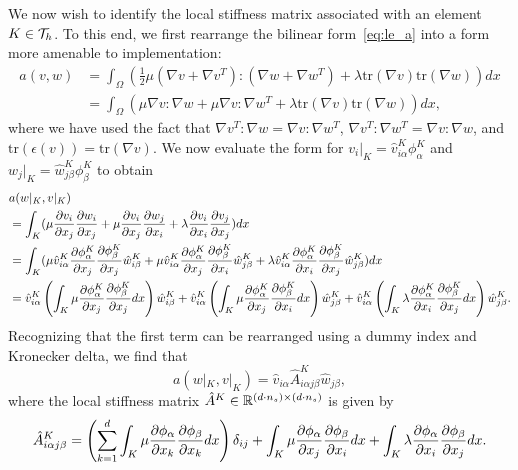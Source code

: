 We now wish to identify the local stiffness matrix associated with an element $K \in \mathcal{T}_h$.  To this end, we first rearrange the bilinear form~\eqref{eq:le_a} into a form more amenable to implementation:
\begin{align*}
  a(v,w)
  &=
  \int_\Omega (\frac{1}{2} \mu (\nabla v + \nabla v^T) : (\nabla w + \nabla w^T) + \lambda \text{tr}(\nabla v) \text{tr}(\nabla w)) dx
  \\
  &=
  \int_\Omega ( \mu \nabla v :\nabla w + \mu \nabla v : \nabla w^T + \lambda \text{tr}(\nabla v) \text{tr}(\nabla w)) dx,
\end{align*}
where we have used the fact that $\nabla v^T : \nabla w = \nabla v : \nabla w^T$, $\nabla v^T: \nabla w^T = \nabla v : \nabla w$, and $\text{tr}(\epsilon(v)) = \text{tr}(\nabla v)$. We now evaluate the form for $v_i|_K = \hat v^K_{i\alpha} \phi^K_\alpha$ and $w_j|_K = \hat w^K_{j\beta} \phi^K_\beta$ to obtain
\begin{align*}
  &a(w|_K ,v|_K) \\
  &=
  \int_K ( \mu \frac{\partial v_i}{\partial x_j} \frac{\partial w_i}{\partial x_j}
  + \mu \frac{\partial v_i}{\partial x_j} \frac{\partial w_j}{\partial x_i}
  + \lambda \frac{\partial v_i}{\partial x_i} \frac{\partial v_j}{\partial x_j} ) dx 
  \\
  &=
  \int_K (
  \mu \hat v^K_{i\alpha} \frac{\partial \phi^K_\alpha}{\partial x_j} \frac{\partial \phi^K_\beta}{\partial x_j} \hat w^K_{i\beta}
  + \mu \hat v^K_{i\alpha} \frac{\partial \phi^K_\alpha}{\partial x_j} \frac{\partial \phi^K_\beta}{\partial x_i} \hat w^K_{j\beta}
  + \lambda \hat v^K_{i\alpha} \frac{\partial \phi^K_\alpha}{\partial x_i} \frac{\partial \phi^K_\beta}{\partial x_j} \hat w^K_{j\beta} ) dx
  \\
  &=
  \hat v^K_{i\alpha} \left( \int_K \mu \frac{\partial \phi^K_\alpha}{\partial x_j} \frac{\partial \phi^K_\beta}{\partial x_j} dx \right) \hat w^K_{i\beta}
  + \hat v^K_{i\alpha} \left( \int_K \mu \frac{\partial \phi^K_\alpha}{\partial x_j} \frac{\partial \phi^K_\beta}{\partial x_i} dx \right) \hat w^K_{j\beta}
  +\hat v^K_{i\alpha} \left( \int_K \lambda \frac{\partial \phi^K_\alpha}{\partial x_i} \frac{\partial \phi^K_\beta}{\partial x_j} dx  \right) \hat w^K_{j\beta}.
\end{align*}
Recognizing that the first term can be rearranged using a dummy index and Kronecker delta, we find that 
\begin{equation*}
  a(w|_K,v|_K) = \hat v_{i\alpha} \hat A^K_{i\alpha j\beta} \hat w_{j\beta},
\end{equation*}
where the local stiffness matrix $\hat A^K \in \mathbb{R}^{(d \cdot n_s) \times (d \cdot n_s)}$ is given by
\begin{equation*}
  \hat A^K_{i\alpha j\beta} = \left( \sum_{k=1}^d \int_K \mu \frac{\partial \phi_\alpha}{\partial x_k} \frac{\partial \phi_\beta}{\partial x_k} dx \right) \delta_{ij} +  \int_K \mu \frac{\partial \phi_\alpha}{\partial x_j} \frac{\partial \phi_\beta}{\partial x_i} dx + \int_K \lambda \frac{\partial \phi_\alpha}{\partial x_i} \frac{\partial \phi_\beta}{\partial x_j} dx.
\end{equation*}
